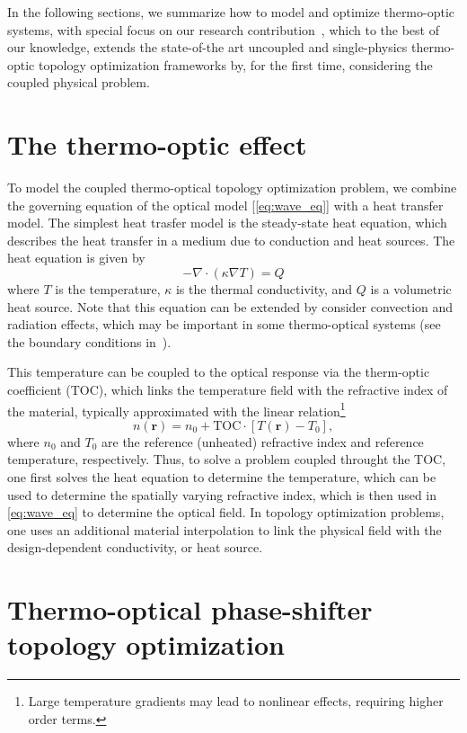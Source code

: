 In the following sections, we summarize how to model and optimize thermo-optic systems, 
with special focus on our research contribution~\cite{ownpub0}, which to the best of our knowledge,
extends the state-of-the art uncoupled and single-physics thermo-optic topology optimization frameworks by, for the first time, considering 
the coupled physical problem.

\section{The thermo-optic effect}

To model the coupled thermo-optical topology optimization problem, we combine the governing equation of the optical model [\eqref{eq:wave_eq}]
with a heat transfer model. The simplest heat trasfer model is the steady-state heat equation, which describes the
heat transfer in a medium due to conduction and heat sources. The heat equation is given by
\begin{equation}\label{eq:heat}
    -\nabla \cdot (\kappa \nabla T) = Q
\end{equation}
where $T$ is the temperature, $\kappa$ is the thermal conductivity, and $Q$ is a volumetric heat source. Note that this equation can be
extended by consider convection and radiation effects, which may be important in some thermo-optical systems (see the boundary conditions
in~\cite{ownpub0}).

This temperature can be coupled to the optical response via the therm-optic coefficient (TOC), which links the temperature field
with the refractive index of the material, typically approximated with the linear relation\footnote{Large temperature gradients may lead to nonlinear effects, requiring higher order terms.}
\begin{equation}
n(\mathbf{r}) = n_0 + \text{TOC} \cdot \left[T(\mathbf{r}) - T_0\right],
\end{equation}
where $n_0$ and $T_0$ are the reference (unheated) refractive index and reference temperature, respectively. Thus, to solve a problem coupled throught the TOC, one first solves the heat equation
to determine the temperature, which can be used to determine
the spatially varying refractive index, which is then used in \eqref{eq:wave_eq} to determine the optical field. In topology optimization
problems, one uses an additional material interpolation to link the physical field with the design-dependent conductivity, or heat source.

\section{Thermo-optical phase-shifter topology optimization~\cite{ownpub0}}

